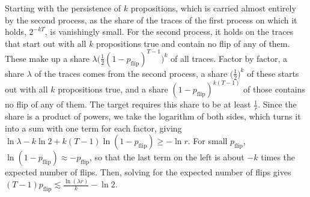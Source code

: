 \documentclass[titlepage,a4paper,11pt]{report}
\begin{document}
    Starting with the persistence of $k$ propositions, which is carried almost entirely by the second process, as the share of the traces of the first process on which it holds, $2^{-kT}$, is vanishingly small. For the second process, it holds on the traces that start out with all $k$ propositions true and contain no flip of any of them. These make up a share $\lambda\bigl(\frac12(1-p_{\text{flip}})^{T-1}\bigr)^k$ of all traces. Factor by factor, a share $\lambda$ of the traces comes from the second process, a share $\bigl(\frac12\bigr)^k$ of these starts out with all $k$ propositions true, and a share $(1-p_{\text{flip}})^{k(T-1)}$ of those contains no flip of any of them. The target requires this share to be at least $\frac1r$. Since the share is a product of powers, we take the logarithm of both sides, which turns it into a sum with one term for each factor, giving $\ln\lambda-k\ln2+k(T-1)\ln(1-p_{\text{flip}})\ge-\ln r$. For small $p_{\text{flip}}$, $\ln(1-p_{\text{flip}})\approx-p_{\text{flip}}$, so that the last term on the left is about $-k$ times the expected number of flips. Then, solving for the expected number of flips gives $(T-1)p_{\text{flip}}\lesssim\frac{\ln(\lambda r)}{k}-\ln2$.
\end{document}
